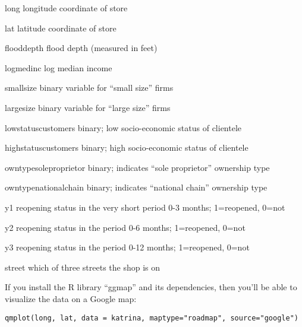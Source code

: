 \documentclass{mynotes}
\begin{document}
\begin{compactdesc}
\item[long] longitude coordinate of store

\item[lat]
latitude coordinate of store

\item[flooddepth]
flood depth (measured in feet)

\item[logmedinc]
log median income

\item[smallsize]
binary variable for ``small size'' firms

\item[largesize]
binary variable for ``large size'' firms

\item[lowstatuscustomers]
binary; low socio-economic status of clientele

\item[highstatuscustomers]
binary; high socio-economic status of clientele

\item[owntypesoleproprietor]
binary; indicates ``sole proprietor'' ownership type

\item[owntypenationalchain]
binary; indicates ``national chain'' ownership type

\item[y1]
reopening status in the very short period 0-3 months; 1=reopened, 0=not

\item[y2]
reopening status in the period 0-6 months; 1=reopened, 0=not

\item[y3]
reopening status in the period 0-12 months; 1=reopened, 0=not

\item[street]
which of three streets the shop is on

\end{compactdesc}

\vspace{\baselineskip}

If you install the R library ``ggmap'' and its dependencies, then you'll be able to visualize the data on a Google map:
\begin{verbatim}
qmplot(long, lat, data = katrina, maptype="roadmap", source="google")
\end{verbatim}
\end{document}
